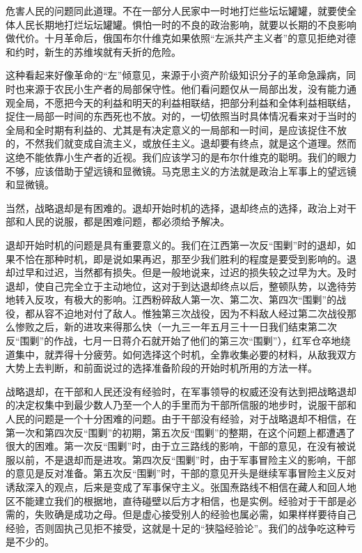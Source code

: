 危害人民的问题同此道理。不在一部分人民家中一时地打烂些坛坛罐罐，就要使全体人民长期地打烂坛坛罐罐。惧怕一时的不良的政治影响，就要以长期的不良影响做代价。十月革命后，俄国布尔什维克如果依照“左派共产主义者”的意见拒绝对德和约时，新生的苏维埃就有夭折的危险。

这种看起来好像革命的“左”倾意见，来源于小资产阶级知识分子的革命急躁病，同时也来源于农民小生产者的局部保守性。他们看问题仅从一局部出发，没有能力通观全局，不愿把今天的利益和明天的利益相联结，把部分利益和全体利益相联结，捉住一局部一时间的东西死也不放。对的，一切依照当时具体情况看来对于当时的全局和全时期有利益的、尤其是有决定意义的一局部和一时间，是应该捉住不放的，不然我们就变成自流主义，或放任主义。退却要有终点，就是这个道理。然而这绝不能依靠小生产者的近视。我们应该学习的是布尔什维克的聪明。我们的眼力不够，应该借助于望远镜和显微镜。马克思主义的方法就是政治上军事上的望远镜和显微镜。

当然，战略退却是有困难的。退却开始时机的选择，退却终点的选择，政治上对干部和人民的说服，都是困难问题，都必须给予解决。

退却开始时机的问题是具有重要意义的。我们在江西第一次反“围剿”时的退却，如果不恰在那种时机，即是说如果再迟，那至少我们胜利的程度是要受到影响的。退却过早和过迟，当然都有损失。但是一般地说来，过迟的损失较之过早为大。及时退却，使自己完全立于主动地位，这对于到达退却终点以后，整顿队势，以逸待劳地转入反攻，有极大的影响。江西粉碎敌人第一次、第二次、第四次“围剿”的战役，都从容不迫地对付了敌人。惟独第三次战役，因为不料敌人经过第二次战役那么惨败之后，新的进攻来得那么快（一九三一年五月三十一日我们结束第二次反“围剿”的作战，七月一日蒋介石就开始了他们的第三次“围剿”），红军仓卒地绕道集中，就弄得十分疲劳。如何选择这个时机，全靠收集必要的材料，从敌我双方大势上去判断，和前面说过的选择准备阶段的开始时机所用的方法一样。

战略退却，在干部和人民还没有经验时，在军事领导的权威还没有达到把战略退却的决定权集中到最少数人乃至一个人的手里而为干部所信服的地步时，说服干部和人民的问题是一个十分困难的问题。由于干部没有经验，对于战略退却不相信，在第一次和第四次反“围剿”的初期，第五次反“围剿”的整期，在这个问题上都遭遇了很大的困难。第一次反“围剿”时，由于立三路线的影响，干部的意见，在没有被说服以前，不是退却而是进攻。第四次反“围剿”时，由于军事冒险主义的影响，干部的意见是反对准备。第五次反“围剿”时，干部的意见开头是继续军事冒险主义反对诱敌深入的观点，后来是变成了军事保守主义。张国焘路线不相信在藏人和回人地区不能建立我们的根据地，直待碰壁以后方才相信，也是实例。经验对于干部是必需的，失败确是成功之母。但是虚心接受别人的经验也属必需，如果样样要待自己经验，否则固执己见拒不接受，这就是十足的“狭隘经验论”。我们的战争吃这种亏是不少的。

